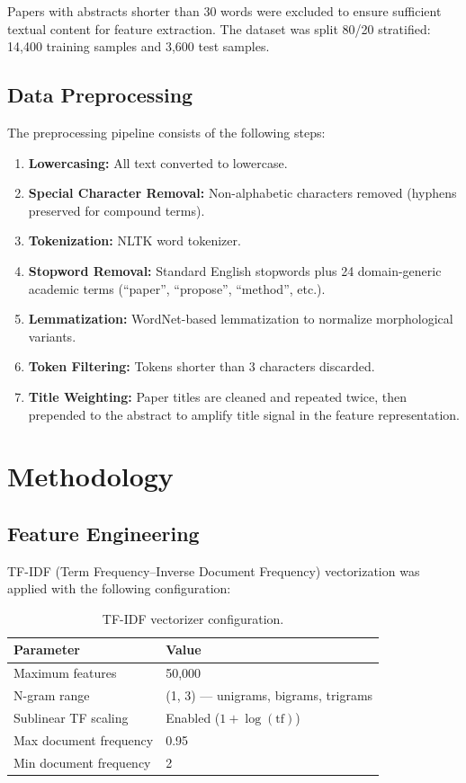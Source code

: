 \documentclass[12pt,a4paper]{article}
\begin{document}
Papers with abstracts shorter than 30 words were excluded to ensure sufficient textual content for feature extraction. The dataset was split 80/20 stratified: 14,400 training samples and 3,600 test samples.

\subsection{Data Preprocessing}

The preprocessing pipeline consists of the following steps:

\begin{enumerate}[leftmargin=1.5cm]
  \item \textbf{Lowercasing:} All text converted to lowercase.
  \item \textbf{Special Character Removal:} Non-alphabetic characters removed (hyphens preserved for compound terms).
  \item \textbf{Tokenization:} NLTK word tokenizer.
  \item \textbf{Stopword Removal:} Standard English stopwords plus 24 domain-generic academic terms (``paper'', ``propose'', ``method'', etc.).
  \item \textbf{Lemmatization:} WordNet-based lemmatization to normalize morphological variants.
  \item \textbf{Token Filtering:} Tokens shorter than 3 characters discarded.
  \item \textbf{Title Weighting:} Paper titles are cleaned and repeated twice, then prepended to the abstract to amplify title signal in the feature representation.
\end{enumerate}

\section{Methodology}

\subsection{Feature Engineering}

TF-IDF (Term Frequency--Inverse Document Frequency) vectorization was applied with the following configuration:

\begin{table}[H]
\centering
\begin{tabular}{@{}ll@{}}
\toprule
\textbf{Parameter} & \textbf{Value} \\ \midrule
Maximum features & 50,000 \\
N-gram range & (1, 3) — unigrams, bigrams, trigrams \\
Sublinear TF scaling & Enabled ($1 + \log(\text{tf})$) \\
Max document frequency & 0.95 \\
Min document frequency & 2 \\
\bottomrule
\end{tabular}
\caption{TF-IDF vectorizer configuration.}
\end{table}
\end{document}
